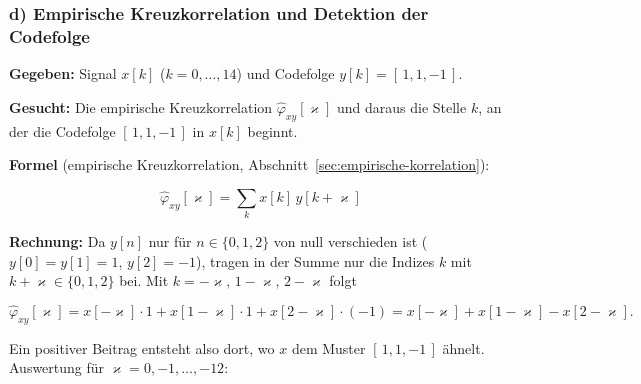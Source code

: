 \subsubsection*{d) Empirische Kreuzkorrelation und Detektion der Codefolge}

\begin{beispiel}

\textbf{Gegeben:} Signal $x[k]$ ($k = 0, \ldots, 14$) und Codefolge
$y[k] = [\,1,1,-1\,]$.

\textbf{Gesucht:} Die empirische Kreuzkorrelation $\hat{\varphi}_{xy}[\varkappa]$
und daraus die Stelle $k$, an der die Codefolge $[\,1,1,-1\,]$ in $x[k]$ beginnt.

\textbf{Formel} (empirische Kreuzkorrelation, Abschnitt~\ref{sec:empirische-korrelation}):

$$
\hat{\varphi}_{xy}[\varkappa] = \sum_{k} x[k]\, y[k + \varkappa]
$$

\textbf{Rechnung:} Da $y[n]$ nur für $n \in \{0,1,2\}$ von null verschieden ist
($y[0]=y[1]=1$, $y[2]=-1$), tragen in der Summe nur die Indizes $k$ mit
$k+\varkappa \in \{0,1,2\}$ bei. Mit $k = -\varkappa,\, 1-\varkappa,\, 2-\varkappa$ folgt

$$
\hat{\varphi}_{xy}[\varkappa]
= x[-\varkappa]\cdot 1 + x[1-\varkappa]\cdot 1 + x[2-\varkappa]\cdot(-1)
= x[-\varkappa] + x[1-\varkappa] - x[2-\varkappa].
$$

Ein positiver Beitrag entsteht also dort, wo $x$ dem Muster $[\,1,1,-1\,]$ ähnelt.
Auswertung für $\varkappa = 0, -1, \ldots, -12$:


\end{beispiel}
